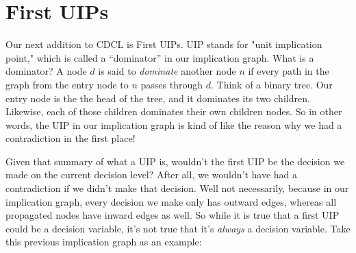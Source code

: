 \section{First UIPs}

Our next addition to CDCL is First UIPs. UIP stands for "unit implication point," which 
is called a ``dominator'' in our implication graph. What is a dominator? A node $d$ is said 
to \textit{dominate} another node $n$ if every path in the graph from the entry node to $n$ 
passes through $d$. Think of a binary tree. Our entry node is the the head of the tree, and 
it dominates its two children. Likewise, each of those children dominates their own children 
nodes. So in other words, the UIP in our implication graph is kind of like the reason why 
we had a contradiction in the first place!

Given that summary of what a UIP is, wouldn't the first UIP be the decision we made on 
the current decision level? After all, we wouldn't have had a contradiction if we didn't 
make that decision. Well not necessarily, because in our implication graph, every decision 
we make only has outward edges, whereas all propagated nodes have inward edges as well. 
So while it is true that a first UIP could be a decision variable, it's not true that it's 
\textit{always} a decision variable. Take this previous implication graph as an example:

